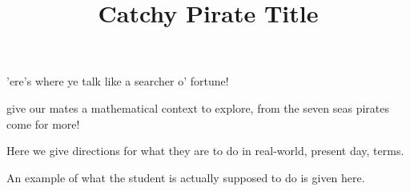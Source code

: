 \documentclass{article}
\title{Catchy Pirate Title}
\begin{document}
\begin{context}
  'ere's where ye talk like a searcher o' fortune!

  give our mates a mathematical context to explore, from the seven
  seas pirates come for more!
\end{context}

\begin{directions}
  Here we give directions for what they are to do in real-world,
  present day, terms.
\end{directions}


\begin{example}
  An example of what the student is actually supposed to do is given
  here.
\end{example}
\end{document}
